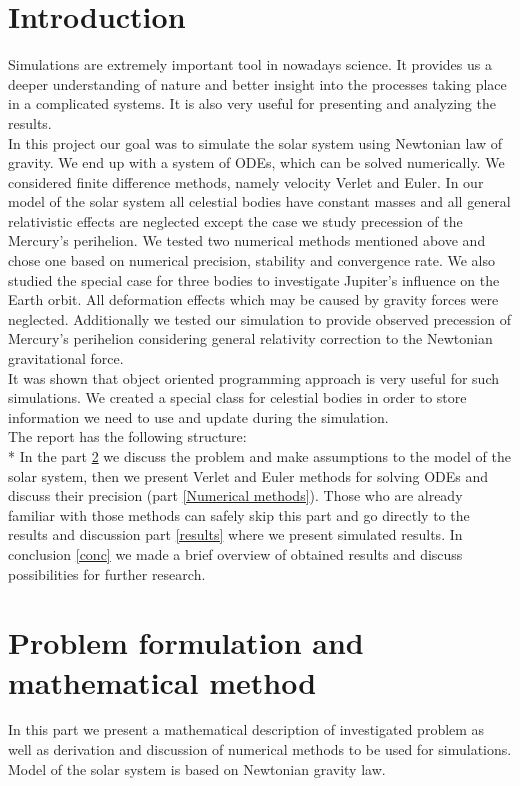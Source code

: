 \documentclass[10pt]{article}
\begin{document}
\section{Introduction}
Simulations are extremely important tool in nowadays science. It provides us a deeper understanding of nature and  better insight into the processes taking place in a complicated systems. It is also very useful for presenting and analyzing the results.\\
In this project our goal was to simulate the solar system using Newtonian law of gravity. We end up with a system of ODEs, which can be solved numerically. We considered finite difference methods, namely velocity Verlet and Euler. In our model of the solar system all celestial bodies have constant masses and all general relativistic effects are neglected except the case we study precession of the Mercury's perihelion. We tested two numerical methods mentioned above and chose one based on numerical precision, stability and convergence rate. We also studied the special case for three bodies to investigate Jupiter's influence on the Earth orbit. All deformation effects which may be caused by gravity forces were neglected. Additionally we tested our simulation to provide observed precession of Mercury's perihelion considering general relativity correction to the Newtonian gravitational force.\\
It was shown that object oriented programming approach is very useful for such simulations. We created a special class for celestial bodies in order to store information we need to use and update during the simulation. \\
The report has the following structure:\\*
In the part \ref{Part1}  we discuss the problem and make assumptions to the model of the solar system, then we present Verlet and Euler methods for solving ODEs and discuss their precision (part \ref{Numerical methods}). Those who are already familiar with those methods can safely skip this part and go directly to the results and discussion part \ref{results}  where we present simulated results. In conclusion \ref{conc} we made a brief overview of obtained results and discuss possibilities for further research. 

 

\newpage
\section{Problem formulation and mathematical method}\label{Part1}
In this part we present a mathematical description of investigated problem as well as derivation and discussion of numerical methods to be used for simulations.  Model of the solar system is based on Newtonian gravity law. 
\end{document}
